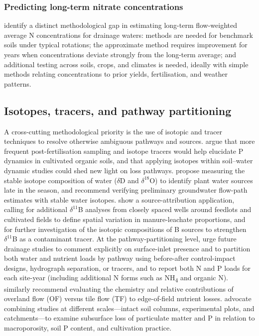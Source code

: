 \subsubsection{Predicting long-term nitrate concentrations}

\textcite{Skaggs2012} identify a distinct methodological gap in estimating long-term flow-weighted average N concentrations for drainage waters: methods are needed for benchmark soils under typical rotations; the approximate method requires improvement for years when concentrations deviate strongly from the long-term average; and additional testing across soils, crops, and climates is needed, ideally with simple methods relating concentrations to prior yields, fertilisation, and weather patterns.

\subsection{Isotopes, tracers, and pathway partitioning}

A cross-cutting methodological priority is the use of isotopic and tracer techniques to resolve otherwise ambiguous pathways and sources. \textcite{Grenon2022} argue that more frequent post-fertilisation sampling and isotope tracers would help elucidate P dynamics in cultivated organic soils, and that applying isotopes within soil--water dynamic studies could shed new light on loss pathways. \textcite{Islam2022} propose measuring the stable isotope composition of water ($\delta$D and $\delta^{18}$O) to identify plant water sources late in the season, and \textcite{YliHalla2022} recommend verifying preliminary groundwater flow-path estimates with stable water isotopes. \textcite{Komor1997} show a source-attribution application, calling for additional $\delta^{11}$B analyses from closely spaced wells around feedlots and cultivated fields to define spatial variation in manure-leachate proportions, and for further investigation of the isotopic compositions of B sources to strengthen $\delta^{11}$B as a contaminant tracer. At the pathway-partitioning level, \textcite{Flores2021} urge future drainage studies to comment explicitly on surface-inlet presence and to partition both water and nutrient loads by pathway using before-after control-impact designs, hydrograph separation, or tracers, and to report both N and P loads for each site-year (including additional N forms such as NH\textsubscript{4} and organic N). \textcite{Kokulan2019} similarly recommend evaluating the chemistry and relative contributions of overland flow (OF) versus tile flow (TF) to edge-of-field nutrient losses. \textcite{Laubel1999} advocate combining studies at different scales---intact soil columns, experimental plots, and catchments---to examine subsurface loss of particulate matter and P in relation to macroporosity, soil P content, and cultivation practice.

